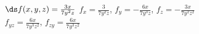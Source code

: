{$\ds f(x,y,z) = \frac{3x}{7y^2z}$}
{$f_x = \frac{3}{7y^2z}$, $f_y = -\frac{6x}{7y^3z}$, $f_z = -\frac{3x}{7y^2z^2}$\\
$f_{yz} = \frac{6x}{7y^3z^2}$, $f_{zy} = \frac{6x}{7y^3z^2}$
}